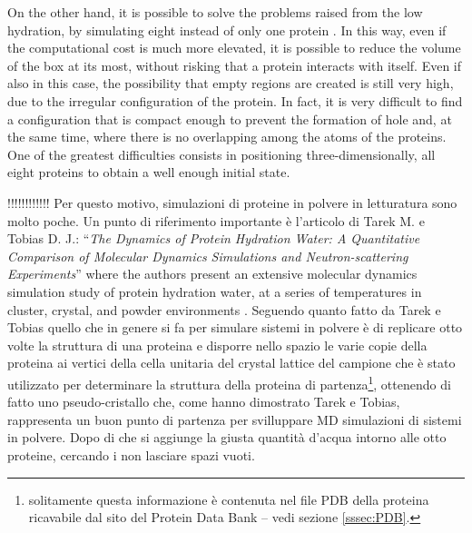 On the other hand, it is possible to solve the problems raised from the low hydration, by simulating eight instead of only one protein \cite{tarek2000dynamics}. In this way, even if the computational cost is much more elevated, it is possible to reduce the volume of the box at its most, without risking that a protein interacts with itself. Even if also in this case, the possibility that empty regions are created is still very high, due to the irregular configuration of the protein. In fact, it is very difficult to find a configuration that is compact enough to prevent the formation of hole and, at the same time, where there is no overlapping among the atoms of the proteins. One of the greatest difficulties consists in positioning three-dimensionally, all eight proteins to obtain a well enough initial state.

!!!!!!!!!!!!
Per questo motivo, simulazioni di proteine in polvere in letturatura sono molto poche. Un punto di riferimento importante è l'articolo di Tarek M. e Tobias D. J.: ``\textit{The Dynamics of Protein Hydration Water: A Quantitative Comparison of Molecular Dynamics Simulations and Neutron-scattering Experiments}'' where the authors present an extensive molecular dynamics simulation study of protein hydration water, at a series of temperatures in cluster, crystal, and powder environments \cite{tarek2000dynamics}.
Seguendo quanto fatto da Tarek e Tobias quello che in genere si fa per simulare sistemi in polvere è di replicare otto volte la struttura di una proteina e disporre nello spazio le varie copie della proteina ai vertici della cella unitaria del crystal lattice del campione che è stato utilizzato per determinare la struttura della proteina di partenza\footnote{solitamente questa informazione è contenuta nel file PDB della proteina ricavabile dal sito del Protein Data Bank -- vedi sezione \ref{sssec:PDB}.}, ottenendo di fatto uno pseudo-cristallo che, come hanno dimostrato Tarek e Tobias, rappresenta un buon punto di partenza per svilluppare MD simulazioni di sistemi in polvere. Dopo di che si aggiunge la giusta quantità d'acqua intorno alle otto proteine, cercando i non lasciare spazi vuoti.


